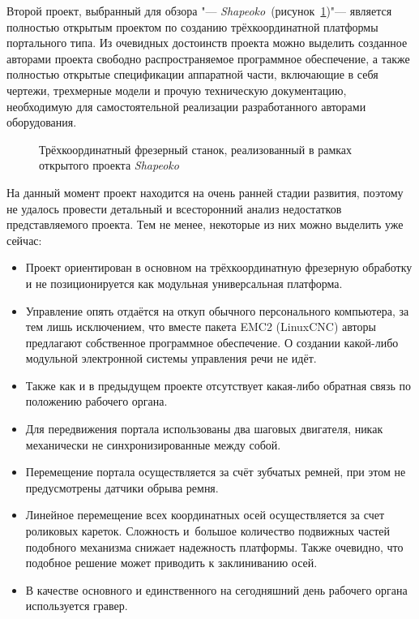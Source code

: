 Второй проект, выбранный для обзора "--- \textit{Shapeoko}~(рисунок~\cref{fig:shapeoko})"--- является полностью открытым проектом по созданию трёхкоординатной платформы портального типа. Из очевидных достоинств проекта можно выделить созданное авторами проекта свободно распространяемое программное обеспечение, а также полностью открытые спецификации аппаратной части, включающие в себя чертежи, трехмерные модели и прочую техническую документацию, необходимую для самостоятельной реализации разработанного авторами оборудования.

\begin{figure}[ht]
	\caption[Трёхкоординатный фрезерный станок, реализованный в рамках открытого проекта Shapeoko]
	{Трёхкоординатный фрезерный станок, реализованный в рамках открытого проекта \textit{Shapeoko}}\label{fig:shapeoko}
\end{figure}

На данный момент проект находится на очень ранней стадии развития, поэтому не удалось провести детальный и всесторонний анализ недостатков представляемого проекта. Тем не менее, некоторые из них можно выделить уже сейчас:

\begin{itemize}
	\item Проект ориентирован в основном на трёхкоординатную фрезерную обработку и не позиционируется как модульная универсальная платформа.
	\item Управление опять отдаётся на откуп обычного персонального компьютера, за тем лишь исключением, что вместе пакета EMC2 (LinuxCNC) авторы предлагают собственное программное обеспечение. О создании какой-либо модульной электронной системы управления речи не идёт.
	\item Также как и в предыдущем проекте отсутствует какая-либо обратная связь по положению рабочего органа.
	\item Для передвижения портала использованы два шаговых двигателя, никак механически не синхронизированные между собой.
	\item Перемещение портала осуществляется за счёт зубчатых ремней, при этом не предусмотрены датчики обрыва ремня.
	\item Линейное перемещение всех координатных осей осуществляется за счет роликовых кареток. Сложность и~большое количество подвижных частей подобного механизма снижает надежность платформы. Также очевидно, что подобное решение может приводить к заклиниванию осей.
	\item В качестве основного и единственного на сегодняшний день рабочего органа используется гравер.
\end{itemize}

